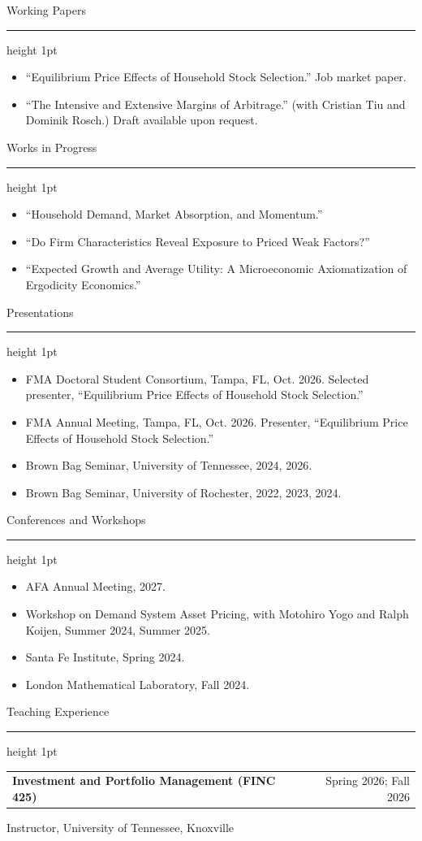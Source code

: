 \documentclass[11pt,letterpaper]{article}
\makeatletter
\newcommand{\cvsection}[1]{%
  \vspace{7.5pt}%
  {\large\color{accent}#1}\par
  \vspace{1.5pt}%
  {\color{accent}\hrule height 1pt}%
  \vspace{2pt}%
}
\newcommand{\datedentry}[2]{%
  \begin{tabular*}{\textwidth}{@{\extracolsep{\fill}}l r}
    \textbf{#1} & {\color{dategray}#2}
  \end{tabular*}\par
}
\makeatother
\begin{document}
\cvsection{Working Papers}
\begin{itemize}
  \item ``Equilibrium Price Effects of Household Stock Selection.'' Job market paper.
  \item ``The Intensive and Extensive Margins of Arbitrage.'' (with Cristian Tiu and Dominik Rosch.) Draft available upon request.
\end{itemize}

\cvsection{Works in Progress}
\begin{itemize}
  \item ``Household Demand, Market Absorption, and Momentum.''
  \item ``Do Firm Characteristics Reveal Exposure to Priced Weak Factors?'' 
  \item ``Expected Growth and Average Utility: A Microeconomic Axiomatization of Ergodicity Economics.'' 
\end{itemize}

\cvsection{Presentations}
\begin{itemize}
  \item FMA Doctoral Student Consortium, Tampa, FL, Oct. 2026. Selected presenter, ``Equilibrium Price Effects of Household Stock Selection.''
  \item FMA Annual Meeting, Tampa, FL, Oct. 2026. Presenter, ``Equilibrium Price Effects of Household Stock Selection.''
  \item Brown Bag Seminar, University of Tennessee, 2024, 2026.
  \item Brown Bag Seminar, University of Rochester, 2022, 2023, 2024.
\end{itemize}

\newpage
\cvsection{Conferences and Workshops}
\begin{itemize}
  \item AFA Annual Meeting, 2027.
  \item Workshop on Demand System Asset Pricing, with Motohiro Yogo and Ralph Koijen, Summer 2024, Summer 2025.
  \item Santa Fe Institute, Spring 2024.
  \item London Mathematical Laboratory, Fall 2024.
\end{itemize}

\cvsection{Teaching Experience}
\datedentry{Investment and Portfolio Management (FINC 425)}{Spring 2026; Fall 2026}
Instructor, University of Tennessee, Knoxville\par
\vspace{3pt}
\end{document}
